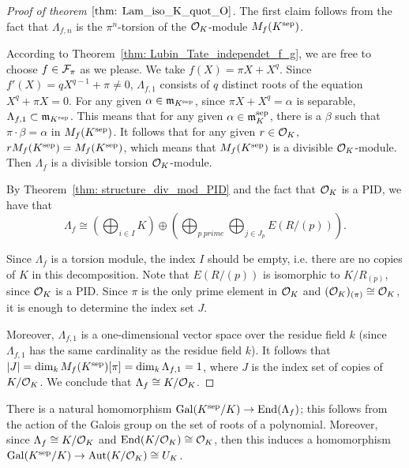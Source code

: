 \begin{proof}[Proof of theorem $\ref{thm: Lam_iso_K_quot_O}$]
    The first claim follows from the fact that $\Lambda_{f,n}$ is the $\pi^n$-torsion of
        the $\mathcal{O}_K$-module $M_f(K^{\mathrm{sep}})$.

    According to Theorem~\ref{thm: Lubin_Tate_independet_f_g}, we are free to choose
    $f\in \mathcal{F}_\pi$ as we please. We take $f(X)= \pi X + X ^ q$. Since
    $f'(X) = q X^{q-1} + \pi \neq 0$, $\Lambda_{f, 1}$ consists of $q$ distinct roots
    of the equation $X^q + \pi X = 0 $. For any given $\alpha \in \mathfrak{m}_{K^{\mathrm{sep}}}$, since
    $\pi X + X ^ q = \alpha$ is separable, $\Lambda_{f,1} \subset \mathfrak{m}_{K^{\mathrm{sep}}}$. This means
    that for any given $\alpha \in \mathfrak{m}_K^{\mathrm{sep}}$, there is a $\beta$ such that
    $\pi \cdot \beta = \alpha$ in $M_f(K^{\mathrm{sep}})$. It follows that for any given $r \in \mathcal{O}_K$,
    $r M_f(K^{\mathrm{sep}}) = M_f (K^{\mathrm{sep}})$, which means that $M_f(K^{\mathrm{sep}})$ is a divisible $\mathcal{O}_K$-module.
    Then $\Lambda_f$ is a divisible torsion $\mathcal{O}_K$-module.

    By Theorem~\ref{thm: structure_div_mod_PID} and the fact that $\mathcal{O}_K$ is a PID,
    we have that
    \[\Lambda_f \cong \left(\bigoplus_{i\in I} K\right) \oplus \left(\bigoplus_{p \ prime} \bigoplus_{j \in J_p}
        E(R / (p))\right).  \]

    Since $\Lambda_f$ is a torsion module, the index $I$ should be empty, i.e.
    there are no copies of $K$ in this decomposition.
    Note that $E(R/(p))$ is isomorphic to $K/R_{(p)}$, since $\mathcal{O}_K$ is a PID.
    Since $\pi$ is the only prime element in $\mathcal{O}_K$ and
    $(\mathcal{O}_K) _ {(\pi)} \cong \mathcal{O}_K$, it is enough to determine the index set
    $J$.

    Moreover, $\Lambda_{f,1}$ is a one-dimensional vector space over the residue field $k$ (since $\Lambda_{f,1}$
    has the same cardinality as the residue field $k$).
    It follows that $|J| = \dim_k M_f(K^{\mathrm{sep}})[\pi] = \dim_k \Lambda_{f,1} = 1$,
    where $J$ is the index set of copies of $K/ \mathcal{O}_K$. We conclude that
    $\Lambda_f \cong K / \mathcal{O}_K$.
\end{proof}

There is a natural homomorphism $\mathrm{Gal} (K^{\mathrm{sep}}/ K) \to \operatorname{End}(\Lambda_f)$; this follows from
the action of the Galois group on the set of roots of a polynomial. Moreover,
since $\Lambda _f \cong K / \mathcal{O}_K$ and $\operatorname{End}(K/\mathcal{O}_K) \cong \mathcal{O}_K$,
then this induces a
homomorphism $\mathrm{Gal}(K^{\mathrm{sep}}/ K) \to \mathrm{Aut}(K / \mathcal{O}_K) \cong U_K$.

